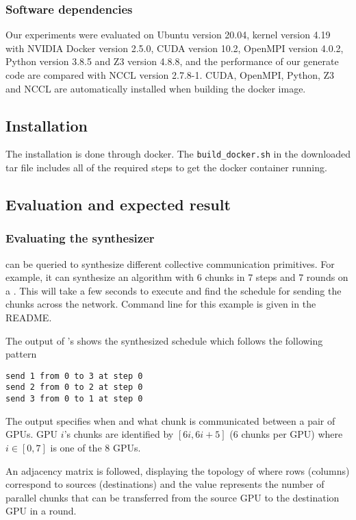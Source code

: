 {\subsubsection{Software dependencies}
Our experiments were evaluated on Ubuntu version 20.04, kernel version 4.19
with NVIDIA Docker version 2.5.0, CUDA version 10.2, OpenMPI version 4.0.2, Python version 3.8.5 and Z3 version 4.8.8, and the performance of our generate code 
are compared with NCCL version 2.7.8-1. CUDA, OpenMPI, Python, Z3 and NCCL are automatically installed when building the docker image.

\subsection{Installation}
The installation is done through docker. The \texttt{build\_docker.sh} in
the downloaded tar file includes all of the required steps to get the docker container running.

\subsection{Evaluation and expected result}

\subsubsection{Evaluating the synthesizer}
\tool{} can be queried to synthesize different collective communication primitives. For example,
it can synthesize an \allgather algorithm with 6 chunks in 7 steps and 7 rounds on a \dgxone. 
This will take a few seconds to execute and find the schedule for sending the chunks across
the network. Command line for this example is given in the README.

The output of \tool's shows the synthesized schedule which follows the following pattern
\begin{verbatim}
send 1 from 0 to 3 at step 0
send 2 from 0 to 2 at step 0
send 3 from 0 to 1 at step 0
\end{verbatim}
The output specifies when and what chunk is communicated between a pair of GPUs. GPU $i$'s chunks are identified by $[6i, 6i+5]$ (6 chunks per GPU)
where $i\in[0,7]$ is one of the $8$ GPUs.

An adjacency matrix is followed, displaying the topology of \dgxone where rows (columns) correspond to sources (destinations) and the value 
represents the number of parallel chunks that can be transferred from the source GPU to the destination GPU in a round.

}
